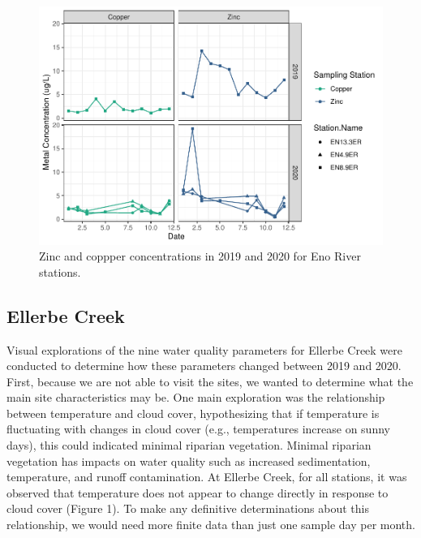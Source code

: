 \documentclass[
  12pt,
]{article}
\begin{document}
\begin{figure}
\centering
\includegraphics{August_Lindborg_ENV872_Project_files/figure-latex/unnamed-chunk-12-1.pdf}
\caption{Zinc and coppper concentrations in 2019 and 2020 for Eno River
stations.}
\end{figure}

\hypertarget{ellerbe-creek}{%
\subsection{Ellerbe Creek}\label{ellerbe-creek}}

Visual explorations of the nine water quality parameters for Ellerbe
Creek were conducted to determine how these parameters changed between
2019 and 2020. First, because we are not able to visit the sites, we
wanted to determine what the main site characteristics may be. One main
exploration was the relationship between temperature and cloud cover,
hypothesizing that if temperature is fluctuating with changes in cloud
cover (e.g., temperatures increase on sunny days), this could indicated
minimal riparian vegetation. Minimal riparian vegetation has impacts on
water quality such as increased sedimentation, temperature, and runoff
contamination. At Ellerbe Creek, for all stations, it was observed that
temperature does not appear to change directly in response to cloud
cover (Figure 1). To make any definitive determinations about this
relationship, we would need more finite data than just one sample day
per month.
\end{document}
